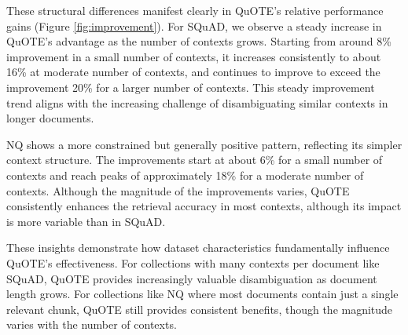 These structural differences manifest clearly in QuOTE's relative performance gains (Figure \ref{fig:improvement}). For SQuAD, we observe a steady increase in QuOTE's advantage as the number of contexts grows. Starting from around 8\% improvement in a small number of contexts, it increases consistently to about 16\% at moderate number of contexts, and continues to improve to exceed the improvement 20\% for a larger number of contexts. This steady improvement trend aligns with the increasing challenge of disambiguating similar contexts in longer documents.

NQ shows a more constrained but generally positive pattern, reflecting its simpler context structure. The improvements start at about 6\% for a small number of contexts and reach peaks of approximately 18\% for a moderate number of contexts. Although the magnitude of the improvements varies, QuOTE consistently enhances the retrieval accuracy in most contexts, although its impact is more variable than in SQuAD.

These insights demonstrate how dataset characteristics fundamentally influence QuOTE's effectiveness. For collections with many contexts per document like SQuAD, QuOTE provides increasingly valuable disambiguation as document length grows. For collections like NQ where most documents contain just a single relevant chunk, QuOTE still provides consistent benefits, though the magnitude varies with the number of contexts.